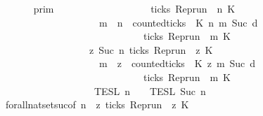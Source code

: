 \begin{isabellebody}
\ \isamarkupfalse%
\ {\isacartoucheopen}{\isachardot}{\isachardot}{\isachardot}\ {\isacharequal}\ {\isasymlbrakk}{\isasymlbrakk}\ {\isasymGamma}\ {\isasymrbrakk}{\isasymrbrakk}\isactrlsub p\isactrlsub r\isactrlsub i\isactrlsub m\ \isanewline
\ \ \ \ \ \ \ \ \ \ \ \ \ \ \ \ {\isasyminter}\ {\isacharbraceleft}{\isasymrho}{\isachardot}\ ticks\ {\isacharparenleft}{\isacharparenleft}Rep{\isacharunderscore}run\ {\isasymrho}{\isacharparenright}\ n\ K\ {\isasymlongrightarrow}\isanewline
\ \ \ \ \ \ \ \ \ \ \ \ \ \ \ \ \ \ \ \ {\isacharparenleft}{\isasymforall}m\ {\isasymge}\ n{\isachardot}\ \ counted{\isacharunderscore}ticks\ {\isasymrho}\ K\ n\ m\ {\isacharparenleft}Suc\ d{\isacharparenright}\isanewline
\ \ \ \ \ \ \ \ \ \ \ \ \ \ \ \ \ \ \ \ \ \ \ \ \ \ \ \ {\isasymlongrightarrow}\ ticks\ {\isacharparenleft}{\isacharparenleft}Rep{\isacharunderscore}run\ {\isasymrho}{\isacharparenright}\ m\ K\ {\isacharbraceright}\isanewline
\ \ \ \ \ \ \ \ \ \ \ \ \ \ \ \ {\isasyminter}\ {\isacharbraceleft}{\isasymrho}{\isachardot}\ {\isasymforall}z{\isasymge}\ Suc\ n{\isachardot}\ ticks\ {\isacharparenleft}{\isacharparenleft}Rep{\isacharunderscore}run\ {\isasymrho}{\isacharparenright}\ z\ K\ {\isasymlongrightarrow}\isanewline
\ \ \ \ \ \ \ \ \ \ \ \ \ \ \ \ \ \ \ \ {\isacharparenleft}{\isasymforall}m\ {\isasymge}\ z{\isachardot}\ \ counted{\isacharunderscore}ticks\ {\isasymrho}\ K\ z\ m\ {\isacharparenleft}Suc\ d{\isacharparenright}\isanewline
\ \ \ \ \ \ \ \ \ \ \ \ \ \ \ \ \ \ \ \ \ \ \ \ \ \ \ \ {\isasymlongrightarrow}\ ticks\ {\isacharparenleft}{\isacharparenleft}Rep{\isacharunderscore}run\ {\isasymrho}{\isacharparenright}\ m\ K\ {\isacharbraceright}\isanewline
\ \ \ \ \ \ \ \ \ \ \ \ \ \ \ \ {\isasyminter}\ {\isasymlbrakk}{\isasymlbrakk}\ {\isasymPsi}\ {\isasymrbrakk}{\isasymrbrakk}\isactrlsub T\isactrlsub E\isactrlsub S\isactrlsub L\isactrlbsup {\isasymge}\ n\isactrlesup \ {\isasyminter}\ {\isasymlbrakk}{\isasymlbrakk}\ {\isasymPhi}\ {\isasymrbrakk}{\isasymrbrakk}\isactrlsub T\isactrlsub E\isactrlsub S\isactrlsub L\isactrlbsup {\isasymge}\ Suc\ n\isactrlesup {\isacartoucheclose}\isanewline
\ \ \ \ \isamarkupfalse%
\ forall{\isacharunderscore}nat{\isacharunderscore}set{\isacharunderscore}suc{\isacharbrackleft}of\ {\isacartoucheopen}n{\isacartoucheclose}\ {\isacartoucheopen}{\isasymlambda}{\isasymrho}\ z{\isachardot}\ ticks\ {\isacharparenleft}{\isacharparenleft}Rep{\isacharunderscore}run\ {\isasymrho}{\isacharparenright}\ z\ K\ {\isasymlongrightarrow}\isanewline

\end{isabellebody}
